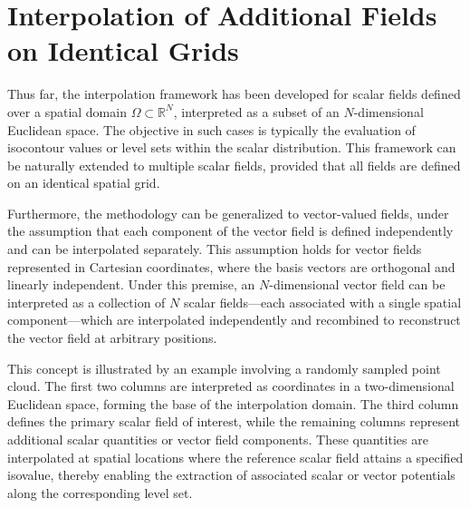 \section{Interpolation of Additional Fields on Identical Grids}

Thus far, the interpolation framework has been developed for scalar fields defined over a spatial domain \(\Omega \subset \mathbb{R}^N\), interpreted as a subset of an \(N\)-dimensional Euclidean space. The objective in such cases is typically the evaluation of isocontour values or level sets within the scalar distribution. This framework can be naturally extended to multiple scalar fields, provided that all fields are defined on an identical spatial grid.

Furthermore, the methodology can be generalized to vector-valued fields, under the assumption that each component of the vector field is defined independently and can be interpolated separately. This assumption holds for vector fields represented in Cartesian coordinates, where the basis vectors are orthogonal and linearly independent. Under this premise, an \(N\)-dimensional vector field can be interpreted as a collection of \(N\) scalar fields---each associated with a single spatial component---which are interpolated independently and recombined to reconstruct the vector field at arbitrary positions.

This concept is illustrated by an example involving a randomly sampled point cloud. The first two columns are interpreted as coordinates in a two-dimensional Euclidean space, forming the base of the interpolation domain. The third column defines the primary scalar field of interest, while the remaining columns represent additional scalar quantities or vector field components. These quantities are interpolated at spatial locations where the reference scalar field attains a specified isovalue, thereby enabling the extraction of associated scalar or vector potentials along the corresponding level set.



